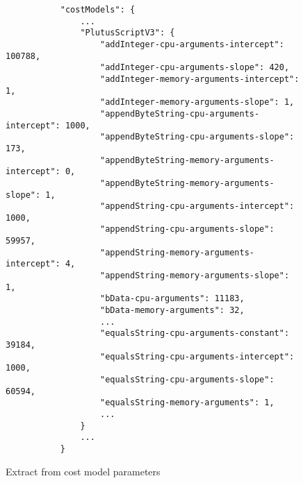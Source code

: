 \documentclass[a4paper]{article}
\begin{document}
\begin{figure}[H]
  \centering \footnotesize
  \begin{verbatim}
           "costModels": {
               ...
               "PlutusScriptV3": {
                   "addInteger-cpu-arguments-intercept": 100788,
                   "addInteger-cpu-arguments-slope": 420,
                   "addInteger-memory-arguments-intercept": 1,
                   "addInteger-memory-arguments-slope": 1,
                   "appendByteString-cpu-arguments-intercept": 1000,
                   "appendByteString-cpu-arguments-slope": 173,
                   "appendByteString-memory-arguments-intercept": 0,
                   "appendByteString-memory-arguments-slope": 1,
                   "appendString-cpu-arguments-intercept": 1000,
                   "appendString-cpu-arguments-slope": 59957,
                   "appendString-memory-arguments-intercept": 4,
                   "appendString-memory-arguments-slope": 1,
                   "bData-cpu-arguments": 11183,
                   "bData-memory-arguments": 32,
                   ...
                   "equalsString-cpu-arguments-constant": 39184,
                   "equalsString-cpu-arguments-intercept": 1000,
                   "equalsString-cpu-arguments-slope": 60594,
                   "equalsString-memory-arguments": 1,
                   ...
               }
               ...
           }
\end{verbatim}
  \caption{Extract from cost model parameters}
  \label{fig:cost-model-parameters-extract}
\end{figure}
\end{document}
